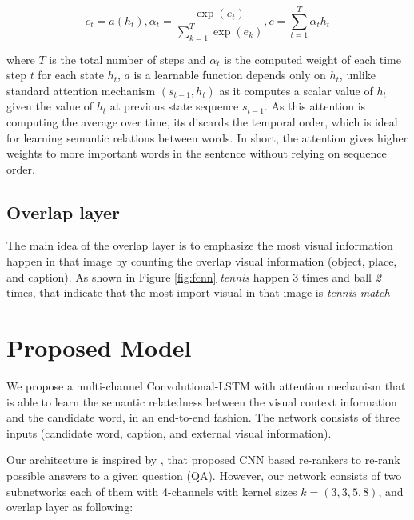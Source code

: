 \documentclass[phd,tocprelim]{cornell}
\begin{document}
\begin{equation}
e_{t}=a\left(h_{t}\right), 
\alpha_{t}=\frac{\exp \left(e_{t}\right)}{\sum_{k=1}^{T} \exp \left(e_{k}\right)}, c=\sum_{t=1}^{T} \alpha_{t} h_{t} 
\end{equation}

where $T$ is the total number of steps and $\alpha_{t}$ is the computed weight of each time step $t$ for each state $h_{t}$, $a$ is a learnable function depends only on $h_{t}$, unlike standard attention mechanism $(s_{t-1}, h_{t})$ as it computes a scalar value of $h_{t}$ given the value of $h_{t}$ at previous state sequence $s_{t-1}$. As this attention is computing the average over time, its discards the temporal order, which is ideal for learning semantic relations between words. In short, the attention gives higher weights to more important words in the sentence without relying on sequence order. 

\subsection{Overlap layer}
The main idea of the overlap layer is to emphasize the most visual information happen in that image by counting the overlap visual information (object, place, and caption). As shown in Figure \ref{fig:fcnn}  \textit{tennis} happen 3 times and ball \textit{2} times, that indicate that the most import visual in that image is  \textit{tennis match}   


\section{Proposed Model} 

We propose a multi-channel Convolutional-LSTM with attention mechanism that is able to learn the semantic relatedness between the visual context information and the candidate word, in an end-to-end fashion. The network consists of three inputs (candidate word, caption, and external visual information). 

Our architecture is inspired by \cite{severyn2015learning}, that proposed CNN based re-rankers to re-rank possible answers to a given question (QA). However, our network consists of two subnetworks each of them with 4-channels with kernel sizes $k=(3,3,5,8)$, and overlap layer as following: 
\end{document}
